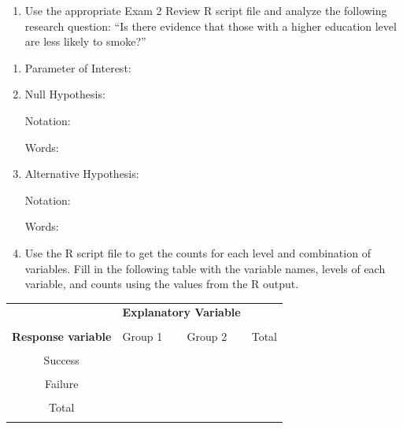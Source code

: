 \documentclass[
]{report}
\providecommand{\tightlist}{%
  \setlength{\itemsep}{0pt}\setlength{\parskip}{0pt}}
\begin{document}
\begin{enumerate}
\def\labelenumi{\arabic{enumi}.}
\setcounter{enumi}{1}
\tightlist
\item
  Use the appropriate Exam 2 Review R script file and analyze the following research question: ``Is there evidence that those with a higher education level are less likely to smoke?''
\end{enumerate}

\begin{enumerate}
\def\labelenumi{\alph{enumi}.}
\item
  Parameter of Interest:
  \vspace{0.3in}
\item
  Null Hypothesis:

  Notation:
  \vspace{0.3in}

  Words:
  \vspace{0.5in}
\item
  Alternative Hypothesis:

  Notation:
  \vspace{0.3in}

  Words:
  \vspace{0.5in}
\item
  Use the R script file to get the counts for each level and combination of variables. Fill in the following table with the variable names, levels of each variable, and counts using the values from the R output.
\end{enumerate}

\begingroup
\setlength{\tabcolsep}{14pt}
\renewcommand{\arraystretch}{2}
\begin{center}
\begin{tabular}{|c|p{1in}|p{1in}|p{1in}|}
\hline
 & \multicolumn{2}{|c|}{\textbf{Explanatory Variable}} & \\ 
 & \multicolumn{2}{|c|}{ } & \\ \hline
\textbf{Response variable} & Group 1 & Group 2 & Total \\
 & & & \\ \hline
 Success & & & \\
 & & & \\ \hline
 Failure & & & \\
 & & & \\ \hline
 Total & & & \\
 & & & \\ \hline
\end{tabular}
\end{center}
\endgroup
\end{document}
